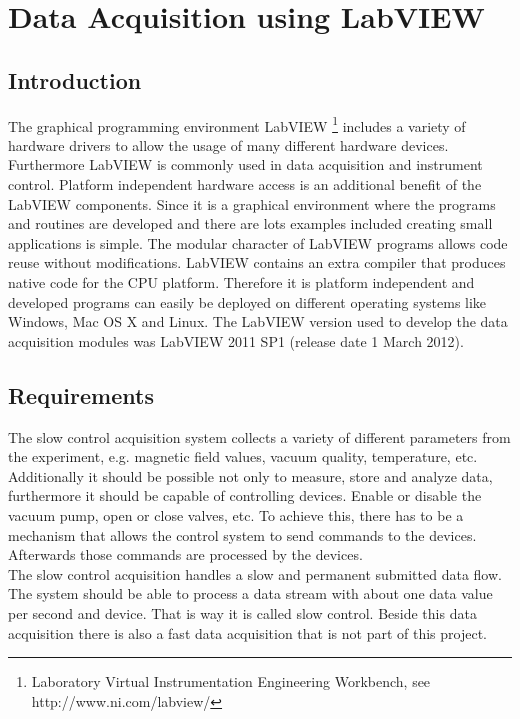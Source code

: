 \chapter{Data Acquisition using LabVIEW}

\section{Introduction}
The graphical programming environment LabVIEW \footnote{Laboratory Virtual Instrumentation Engineering Workbench, see http://www.ni.com/labview/} includes a variety of hardware drivers to allow the usage of many different hardware devices. Furthermore LabVIEW is commonly used in data acquisition and instrument control. Platform independent hardware access is an additional benefit of the LabVIEW components. Since it is a graphical environment where the programs and routines are developed and there are lots examples included creating small applications is simple. The modular character of LabVIEW programs allows code reuse without modifications. LabVIEW contains an extra compiler that produces native code for the CPU platform. Therefore it is platform independent and developed programs can easily be deployed on different operating systems like Windows, Mac OS X and Linux. The LabVIEW version used to develop the data acquisition modules was LabVIEW 2011 SP1 (release date 1 March 2012).

\section{Requirements}
The slow control acquisition system collects a variety of different parameters from the experiment, e.g. magnetic field values, vacuum quality, temperature, etc. Additionally it should be possible not only to measure, store and analyze data, furthermore it should be capable of controlling devices. Enable or disable the vacuum pump, open or close valves, etc. To achieve this, there has to be a mechanism that allows the control system to send commands to the devices. Afterwards those commands are processed by the devices.\\

The slow control acquisition handles a slow and permanent submitted data flow. The system should be able to process a data stream with about one data value per second and device. That is way it is called slow control. Beside this data acquisition there is also a fast data acquisition that is not part of this project.\\

